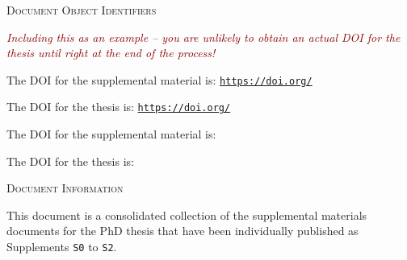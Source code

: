 {\LARGE\textsc{Document Object Identifiers}}
\label{sec:doc-doi}

\par \vspace{0.5em}

\textcolor{darkred}{\textit{\footnotesize Including this as an example -- you are unlikely to obtain an actual DOI for the thesis until right at the end of the process!}}

\ifprintversion

	The DOI for the supplemental material is: {\large \href{https://doi.org/\doiIndex}{\textcolor{hyperdarkergray}{\texttt{https://doi.org/\doiIndex}}}}%

	The DOI for the thesis is: {\large \href{https://doi.org/\doiExampleDocument}{\textcolor{hyperdarkergray}{\texttt{https://doi.org/\doiExampleDocument}}}}%


\else

	The DOI for the supplemental material is: {\large {}}

	The DOI for the thesis is: {\large {}}

\fi



\par \vspace{8em}


{\LARGE\textsc{Document Information}}
\label{sec:doc-info}

\par \vspace{0.5em}

This document is a consolidated collection of the supplemental materials documents for the PhD thesis that have been individually published as Supplements \texttt{S0} to \texttt{S2}.

